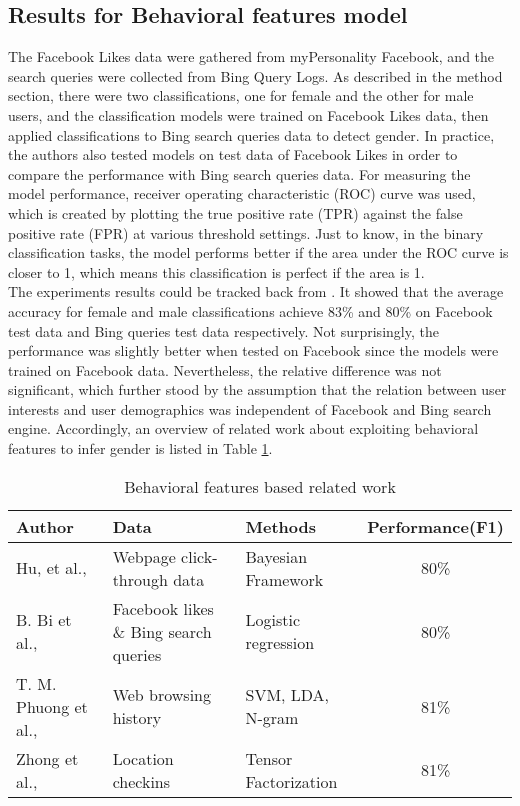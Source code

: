 \documentclass[runningheads]{llncs}
\begin{document}
	\subsection{Results for Behavioral features model}
	
	The Facebook Likes data were gathered from myPersonality Facebook, and the search queries were collected from Bing Query Logs. As described in the method section, there were two classifications, one for female and the other for male users, and the classification models were trained on Facebook Likes data, then applied classifications to Bing search queries data to detect gender. In practice, the authors also tested models on test data of Facebook Likes in order to compare the performance with Bing search queries data. For measuring the model performance, receiver operating characteristic (ROC) curve was used, which is created by plotting the true positive rate (TPR) against the false positive rate (FPR) at various threshold settings. Just to know, in the binary classification tasks, the model performs better if the area under the ROC curve is closer to 1, which means this classification is perfect if the area is 1. \\
	
	The experiments results could be tracked back from \cite{bi2013inferring}. It showed that the average accuracy for female and male classifications achieve 83\% and 80\% on Facebook test data and Bing queries test data respectively. Not surprisingly, the performance was slightly better when tested on Facebook since the models were trained on Facebook data. Nevertheless, the relative difference was not significant, which further stood by the assumption that the relation between user interests and user demographics was independent of Facebook and Bing search engine. 
	Accordingly, an overview of related work about exploiting behavioral features to infer gender is listed in Table \ref{table:behavioral_work}.
	
	\begin{table}
		\caption{Behavioral features based related work }
		\centering
		\begin{tabular}{| l | l | l | c | }
			\hline
			Author  &  Data  & Methods & Performance(F1)\\
			\hline
			Hu, et al.,  \cite{hu2007demographic} & Webpage click-through data
			& Bayesian Framework
			& 80\% \\
			B. Bi et al., \cite{bi2013inferring} & Facebook likes \& Bing search queries & Logistic regression & 80\% \\
			T. M. Phuong et al., \cite{phuong2014gender} & Web browsing history & SVM, LDA, N-gram
			& 81\% \\
			Zhong et al., \cite{zhong2015you} & Location checkins & Tensor Factorization & 81\% \\
			\hline
		\end{tabular}
		\label{table:behavioral_work}
	\end{table}
	
\end{document}

